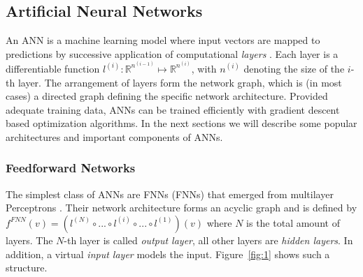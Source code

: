 \subsection{Artificial Neural Networks}
An \ac{ANN} is a machine learning model where input vectors are mapped to predictions by successive application of computational \textit{layers} \autocite{rumelhart_parallel_1986}. Each layer is a differentiable function $l^{(i)}: \mathbb{R}^{n^{(i-1)}} \mapsto \mathbb{R}^{n^{(i)}}$, with $n^{(i)}$ denoting the size of the $i$-th layer. %
The arrangement of layers form the network graph, which is (in most cases) a directed graph defining the specific network architecture. Provided adequate training data, \ac{ANN}s can be trained efficiently with gradient descent based optimization algorithms. In the next sections we will describe some popular architectures and important components of \ac{ANN}s. 

\subsubsection{Feedforward Networks}
The simplest class of \ac{ANN}s are \acl{FNN}s (\acs{FNN}s) that emerged from multilayer Perceptrons \autocite{rosenblatt_perceptron_1958}. Their network architecture forms an acyclic graph and is defined by $f^{FNN}(v) = (l^{(N)} \circ ... \circ l^{(i)} \circ ... \circ l^{(1)})(v)$ where $N$ is the total amount of layers. The $N$-th layer is called \textit{output layer}, all other layers are \textit{hidden layers}. In addition, a virtual \textit{input layer} models the input. Figure~\ref{fig:1} \autocite{epelbaum_deep_2017} shows such a structure. 

